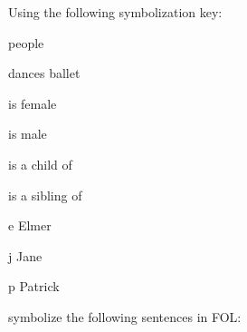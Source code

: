 \solutions
\problempart
\label{pr.FOLballet}
Using the following symbolization key:
\begin{ekey}
\item[\text{论域}] people
\item[\atom{D}{x}]  dances ballet
\item[\atom{F}{x}]  is female
\item[\atom{M}{x}]  is male
\item[\atom{C}{x,y}]  is a child of 
\item[\atom{S}{x,y}]  is a sibling of 
\item[e] Elmer
\item[j] Jane
\item[p] Patrick
\end{ekey}
symbolize the following sentences in FOL:
